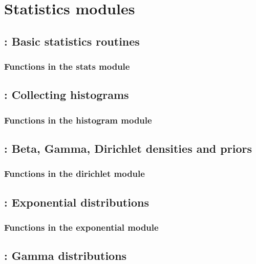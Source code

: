 \documentclass[10pt]{book}
\begin{document}
\chapter{Statistics modules}


\newpage
\section{: Basic statistics routines}

\subsection{Functions in the stats module}


\newpage
\section{: Collecting histograms}

\subsection{Functions in the histogram module}


\newpage
\section{: Beta, Gamma, Dirichlet densities and priors}

\subsection{Functions in the dirichlet module}


\newpage
\section{: Exponential distributions}

\subsection{Functions in the exponential module}


\newpage
\section{: Gamma distributions}

\end{document}
